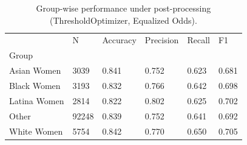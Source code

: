 \begin{table}[htbp]
\centering
\caption{Group-wise performance under post-processing (ThresholdOptimizer, Equalized Odds).}
\label{tab:12-postproc-group-metrics}
\begin{tabular}{llllll}
\toprule
 & N & Accuracy & Precision & Recall & F1 \\
Group &  &  &  &  &  \\
\midrule
Asian Women & 3039 & 0.841 & 0.752 & 0.623 & 0.681 \\
Black Women & 3193 & 0.832 & 0.766 & 0.642 & 0.698 \\
Latina Women & 2814 & 0.822 & 0.802 & 0.625 & 0.702 \\
Other & 92248 & 0.839 & 0.752 & 0.641 & 0.692 \\
White Women & 5754 & 0.842 & 0.770 & 0.650 & 0.705 \\
\bottomrule
\end{tabular}

\end{table}